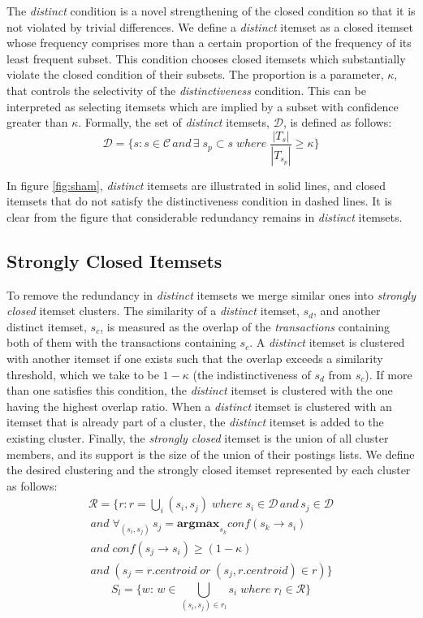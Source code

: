 \documentclass{sig-alternate}
\begin{document}
The \emph{distinct} condition is a novel strengthening of the closed condition
so that it is not violated by trivial differences.
We define a \emph{distinct} itemset as a closed itemset whose frequency
comprises more than a certain proportion of the frequency of its least
frequent subset. 
This condition chooses closed itemsets which substantially violate the closed
condition of their subsets.
The proportion is a parameter, $\kappa$, that controls the selectivity of the
\emph{distinctiveness} condition.
This can be interpreted as selecting itemsets which are implied by a subset
with confidence greater than $\kappa$.
Formally, the set of \emph{distinct} itemsets, $\mathcal{D}$,
is defined as follows:
\begin{equation}\mathcal{D} = \{s: s \in \mathcal{C} \, and \, \exists \; s_{p} \subset s \; where \; \frac{|T_{s}|}{|T_{s_{p}}|} \ge \kappa 
\}\end{equation}

In figure \ref{fig:sham}, \emph{distinct} itemsets are illustrated in solid
lines, and closed itemsets that do not satisfy the distinctiveness condition in dashed lines.
It is clear from the figure that considerable redundancy remains in
\emph{distinct} itemsets.

\subsection{Strongly Closed Itemsets}
To remove the redundancy in \emph{distinct} itemsets we merge similar ones
into \emph{strongly closed} itemset clusters.
The similarity of a \emph{distinct} itemset,
$s_d$, and another distinct itemset, $s_c$,
is measured as the overlap of the \emph{transactions} containing both of them
with the transactions containing $s_c$. 
A \emph{distinct} itemset is clustered with another itemset if one exists
such that the overlap exceeds a similarity threshold,
which we take to be $1-\kappa$ (the indistinctiveness of $s_d$ from $s_c$).
If more than one satisfies this condition,
the  \emph{distinct} itemset is clustered with the one having the highest
overlap ratio.
When  a \emph{distinct} itemset is clustered with an itemset that is already
part of a cluster, the \emph{distinct} itemset is added to the existing cluster.
Finally, the \emph{strongly closed} itemset is the union of all cluster members,
and its support is the size of the union of their postings lists.
We define the  desired clustering  and the strongly closed itemset
represented by each cluster as follows:
\begin{align*}\label{eq:strongClosedFormal}
\mathcal{R} = \{r: r = \bigcup_i{(s_i, s_j)}\; where\; s_i \in \mathcal{D} \, and \, s_j \in \mathcal{D} 
\\\,and\; \forall_{(s_i,s_j)} \, s_j = \textbf{argmax}_{s_k} conf(s_k \rightarrow s_i) \\\,and \;conf(s_j \rightarrow s_i) \ge (1-\kappa)
\\\, and\;( s_j = r.centroid\; or \; (s_j, r.centroid) \in r )\}
\end{align*}
\begin{equation}S_l = \{w:\, w \in \bigcup_{(s_i, s_j) \in r_l}{s_i} \; where \; r_l \in \mathcal{R}\}\end{equation}
\end{document}
